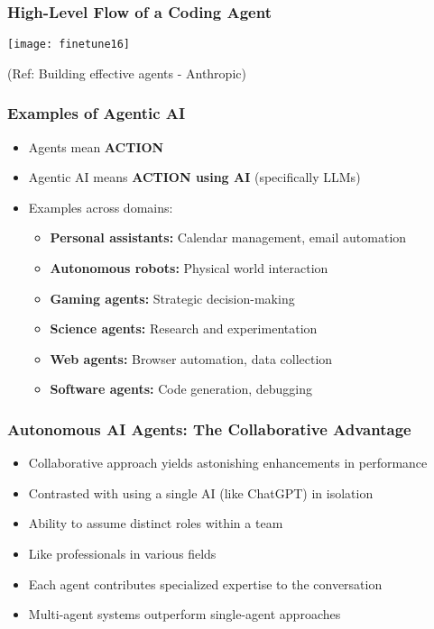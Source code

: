 \begin{frame}[fragile]\frametitle{High-Level Flow of a Coding Agent}
\begin{center}
\texttt{[image: finetune16]}
\end{center}

{\tiny (Ref: Building effective agents - Anthropic)}
\end{frame}

\begin{frame}[fragile]\frametitle{Examples of Agentic AI}
\begin{itemize}
    \item Agents mean \textbf{ACTION}
    \item Agentic AI means \textbf{ACTION using AI} (specifically LLMs)
    \item Examples across domains:
    \begin{itemize}
        \item \textbf{Personal assistants:} Calendar management, email automation
        \item \textbf{Autonomous robots:} Physical world interaction
        \item \textbf{Gaming agents:} Strategic decision-making
        \item \textbf{Science agents:} Research and experimentation
        \item \textbf{Web agents:} Browser automation, data collection
        \item \textbf{Software agents:} Code generation, debugging
    \end{itemize}
\end{itemize}
\end{frame}

\begin{frame}[fragile]\frametitle{Autonomous AI Agents: The Collaborative Advantage}
\begin{itemize}
    \item Collaborative approach yields astonishing enhancements in performance
    \item Contrasted with using a single AI (like ChatGPT) in isolation
    \item Ability to assume distinct roles within a team
    \item Like professionals in various fields
    \item Each agent contributes specialized expertise to the conversation
    \item Multi-agent systems outperform single-agent approaches
\end{itemize}
\end{frame}

